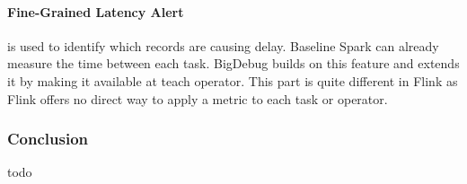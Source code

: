 \paragraph{Fine-Grained Latency Alert} is used to identify which records are causing delay. Baseline Spark can already measure the time between each task. BigDebug builds on this feature and extends it by making it available at teach operator. This part is quite different in Flink as Flink offers no direct way to apply a metric to each task or operator.

\subsubsection{Conclusion}
todo
